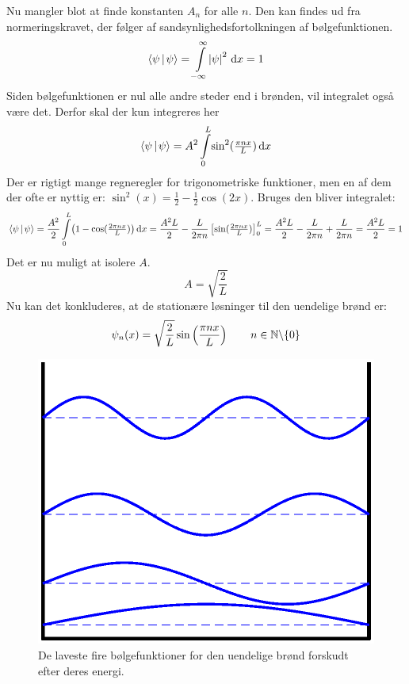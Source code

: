 \documentclass[../Kvantemekanik.tex]{subfiles}
\begin{document}
Nu mangler blot at finde konstanten $A_n$ for alle $n$. Den kan findes ud fra normeringskravet, der følger af sandsynlighedsfortolkningen af bølgefunktionen.
$$
\braket{\psi}{\psi} = \integral{\abs{\psi}^2}{x}{-\infty}{\infty} = 1
$$ 
Siden bølgefunktionen er nul alle andre steder end i brønden, vil integralet også være det. Derfor skal der kun integreres her
$$
\braket{\psi}{\psi} = A^2\integral{\sin^2(\tfrac{\pi n x}{L})}{x}{0}{L} 
$$
Der er rigtigt mange regneregler for trigonometriske funktioner, men en af dem der ofte er nyttig er: $\sin^2(x) =\frac{1}{2}-\frac{1}{2}\cos(2x)$. Bruges den bliver integralet:
$$
\braket{\psi}{\psi} = \frac{A^2}{2}\integral{\big(1-\cos(\tfrac{2\pi n x}{L})\big)}{x}{0}{L} = \frac{A^2L}{2}-\frac{L}{2\pi n}\left[\sin(\tfrac{2\pi nx}{L})\right]_0^L = \frac{A^2L}{2}-\frac{L}{2\pi n}+\frac{L}{2\pi n} = \frac{A^2L}{2} = 1
$$
Det er nu muligt at isolere $A$.
\begin{equation}
A=\sqrt{\frac{2}{L}}
\end{equation}
Nu kan det konkluderes, at de stationære løsninger til den uendelige brønd er:
\begin{equation}
\psi_n(x) = \sqrt{\frac{2}{L}}\sin\left(\frac{\pi nx}{L}\right)~~~~~~n\in \mathbb{N}\backslash\{0\}
\end{equation}
\begin{figure}
\center
\includegraphics[width = 0.75 \textwidth]{Kvantemekanik/billeder/infwellwave.eps}
\caption{De laveste fire bølgefunktioner for den uendelige brønd forskudt efter deres energi.}
\end{figure}
\end{document}
